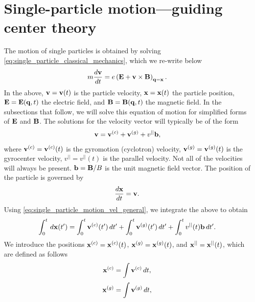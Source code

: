 \documentclass[oneside,a4paper,11pt]{report}
\begin{document}
\chapter{Single-particle motion---guiding center theory}
The motion of single particles is obtained by solving \cref{eq:single_particle_classical_mechanics}, which we re-write below
\begin{equation}
\label{eq:single_particle_motion}
    m \frac{d \mathbf{v}}{dt} = e \left ( \mathbf{E} + \mathbf{v} \times \mathbf{B} \right )_{\mathbf{q} = \mathbf{x}}.
\end{equation}
In the above, $\mathbf{v} = \mathbf{v}(t)$ is the particle velocity, $\mathbf{x} = \mathbf{x}(t)$ the particle position, $\mathbf{E} = \mathbf{E}(\mathbf{q},t)$ the electric field, and $\mathbf{B} = \mathbf{B}(\mathbf{q},t)$ the magnetic field. In the subsections that follow, we will solve this equation of motion for simplified forms of $\mathbf{E}$ and $\mathbf{B}$. The solutions for the velocity vector will typically be of the form
\begin{equation}
    \label{eq:single_particle_motion_vel_general}
    \mathbf{v} = \mathbf{v}^{(c)} + \mathbf{v}^{(g)} + v^{||} \mathbf{b},
\end{equation}
where $\mathbf{v}^{(c)} = \mathbf{v}^{(c)}(t)$ is the gyromotion (cyclotron) velocity, $\mathbf{v}^{(g)} = \mathbf{v}^{(g)}(t)$ is the gyrocenter velocity, $v^{||} = v^{||}(t)$ is the parallel velocity. Not all of the velocities will always be present. $\mathbf{b} = \mathbf{B} / B$ is the unit magnetic field vector. The position of the particle is governed by 
\begin{equation}
    \frac{d\mathbf{x}}{dt} = \mathbf{v}.
\end{equation}
Using \cref{eq:single_particle_motion_vel_general}, we integrate the above to obtain
\begin{equation}
    \label{eq:single_particle_motion_pos_eq_mod}
    \int_0^t \, d\mathbf{x}(t') = \int_0^t \mathbf{v}^{(c)}(t') \, dt' + \int_0^t \mathbf{v}^{(g)}(t') \, dt' + \int_0^t v^{||}(t) \mathbf{b} \, dt'.
\end{equation}
We introduce the positions $\mathbf{x}^{(c)} = \mathbf{x}^{(c)}(t)$, $\mathbf{x}^{(g)} = \mathbf{x}^{(g)}(t)$, and $\mathbf{x}^{||} = \mathbf{x}^{||}(t)$, which are defined as follows
\begin{equation}
    \mathbf{x}^{(c)} = \int \mathbf{v}^{(c)} \, dt,
\end{equation}
\begin{equation}
    \mathbf{x}^{(g)} = \int \mathbf{v}^{(g)} \, dt,
\end{equation}
\end{document}
